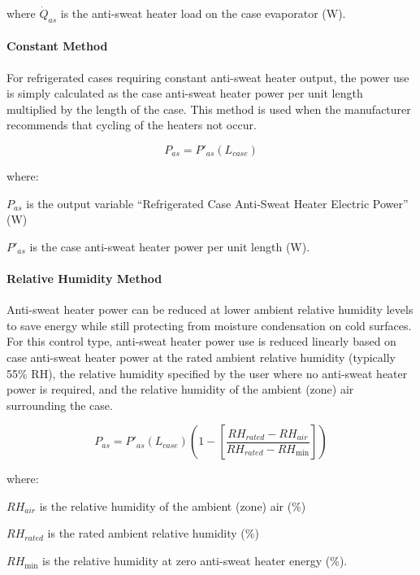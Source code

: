 where \({\dot Q_{as}}\) is the anti-sweat heater load on the case evaporator (W).

\paragraph{Constant Method}\label{constant-method}

For refrigerated cases requiring constant anti-sweat heater output, the power use is simply calculated as the case anti-sweat heater power per unit length multiplied by the length of the case. This method is used when the manufacturer recommends that cycling of the heaters not occur.

\begin{equation}
{P_{as}} = {P'}_{as} \left( {{L_{case}}} \right)
\end{equation}

where:

\({P_{as}}\) is the output variable ``Refrigerated Case Anti-Sweat Heater Electric Power'' (W)

\({P'}_{as}\) is the case anti-sweat heater power per unit length (W).

\paragraph{Relative Humidity Method}\label{relative-humidity-method}

Anti-sweat heater power can be reduced at lower ambient relative humidity levels to save energy while still protecting from moisture condensation on cold surfaces. For this control type, anti-sweat heater power use is reduced linearly based on case anti-sweat heater power at the rated ambient relative humidity (typically 55\% RH), the relative humidity specified by the user where no anti-sweat heater power is required, and the relative humidity of the ambient (zone) air surrounding the case.

\begin{equation}
{P_{as}} = {P'}_{as}\left( {{L_{case}}} \right)\left( {1 - \left[ {\frac{{R{H_{rated}} - R{H_{air}}}}{{R{H_{rated}} - R{H_{\min }}}}} \right]} \right)
\end{equation}

where:

\(R{H_{air}}\) is the relative humidity of the ambient (zone) air (\%)

\(R{H_{rated}}\) is the rated ambient relative humidity (\%)

\(R{H_{\min }}\) is the relative humidity at zero anti-sweat heater energy (\%).

